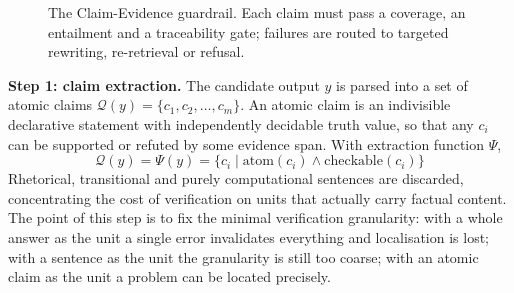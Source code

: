 \documentclass[journal,10pt,a4paper]{IEEEtran}
\begin{document}
\begin{figure}[t]
\centering
{}
\caption{The Claim-Evidence guardrail. Each claim must pass a coverage, an entailment and a traceability gate; failures are routed to targeted rewriting, re-retrieval or refusal.}
\label{fig:gate}
\end{figure}

\textbf{Step 1: claim extraction.} The candidate output $y$ is parsed into a set of atomic claims $\mathcal{Q}(y)=\{c_1,c_2,\dots,c_m\}$. An atomic claim is an indivisible declarative statement with independently decidable truth value, so that any $c_i$ can be supported or refuted by some evidence span. With extraction function $\Psi$,
\begin{equation}
\mathcal{Q}(y)=\Psi(y)=\{c_i\mid\mathrm{atom}(c_i)\wedge\mathrm{checkable}(c_i)\}
\end{equation}
Rhetorical, transitional and purely computational sentences are discarded, concentrating the cost of verification on units that actually carry factual content. The point of this step is to fix the minimal verification granularity: with a whole answer as the unit a single error invalidates everything and localisation is lost; with a sentence as the unit the granularity is still too coarse; with an atomic claim as the unit a problem can be located precisely.
\end{document}
